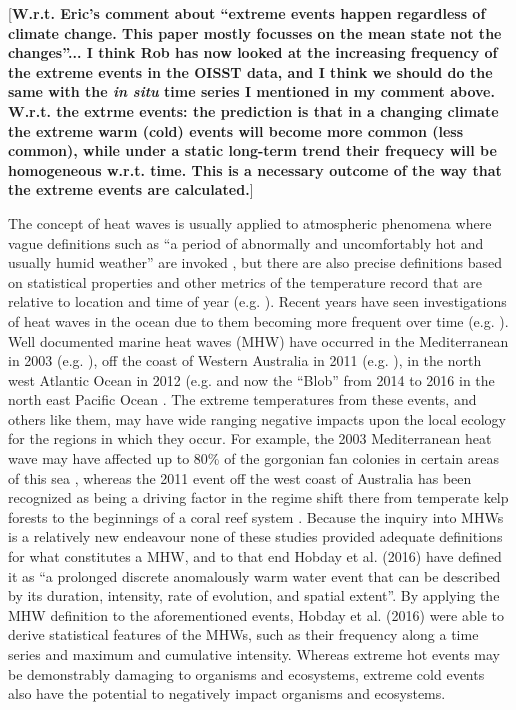 \documentclass[a4paper,10pt,review]{elsarticle}
\begin{document}
[\textbf{W.r.t. Eric's comment about ``extreme events happen regardless of climate change. This paper mostly focusses on the mean state not the changes''... I think Rob has now looked at the increasing frequency of the extreme events in the OISST data, and I think we should do the same with the \emph{in situ} time series I mentioned in my comment above. W.r.t. the extrme events: the prediction is that in a changing climate the extreme warm (cold) events will become more common (less common), while under a static long-term trend their frequecy will be homogeneous w.r.t. time. This is a necessary outcome of the way that the extreme events are calculated.}]

The concept of heat waves is usually applied to atmospheric phenomena where vague definitions such as ``a period of abnormally and uncomfortably hot and usually humid weather'' are invoked \cite{Glickman2000}, but there are also precise definitions based on statistical properties and other metrics of the temperature record that are relative to location and time of year (e.g. \cite{Meehl2004, Alexander2006, Fischer2010, Fischer2011}). Recent years have seen investigations of heat waves in the ocean due to them becoming more frequent over time (e.g. \cite{Mackenzie2007, Selig2010, Sura2011, Lima2012, DeCastro2014}). Well documented marine heat waves (MHW) have occurred in the Mediterranean in 2003 (e.g. \cite{Black2004, Olita2007, Garrabou2009}), off the coast of Western Australia in 2011 (e.g. \cite{Feng2013, Pearce2013, Wernberg2013}), in the north west Atlantic Ocean in 2012 (e.g. \cite{Mills2012, Chen2014, Chen2015} and now the ``Blob'' from 2014 to 2016 in the north east Pacific Ocean \cite{Bond2015}. The extreme temperatures from these events, and others like them, may have wide ranging negative impacts upon the local ecology for the regions in which they occur. For example, the 2003 Mediterranean heat wave may have affected up to 80\% of the gorgonian fan colonies in certain areas of this sea \cite{Garrabou2009}, whereas the 2011 event off the west coast of Australia has been recognized as being a driving factor in the regime shift there from temperate kelp forests to the beginnings of a coral reef system \cite{Wernberg2013}. Because the inquiry into MHWs is a relatively new endeavour none of these studies provided adequate definitions for what constitutes a MHW, and to that end Hobday et al. (2016) \cite{Hobday2016} have defined it as ``a prolonged discrete anomalously warm water event that can be described by its duration, intensity, rate of evolution, and spatial extent''. By applying the MHW definition to the aforementioned events, Hobday et al. (2016) \cite{Hobday2016} were able to derive statistical features of the MHWs, such as their frequency along a time series and maximum and cumulative intensity. Whereas extreme hot events may be demonstrably damaging to organisms and ecosystems, extreme cold events also have the potential to negatively impact organisms and ecosystems.
\end{document}
